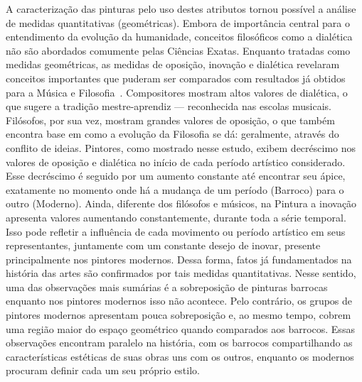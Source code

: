 A caracterização das pinturas pelo uso destes atributos tornou
possível a análise de medidas quantitativas (geométricas). Embora de
importância central para o entendimento da evolução da humanidade,
conceitos filosóficos como a dialética não são abordados comumente
pelas Ciências Exatas. Enquanto tratadas como medidas geométricas, as
medidas de oposição, inovação e dialética revelaram conceitos
importantes que puderam ser comparados com resultados já obtidos para
a Música e Filosofia~\cite{vieira}. Compositores mostram altos valores
de dialética, o que sugere a tradição mestre-aprendiz --- reconhecida
nas escolas musicais. Filósofos, por sua vez, mostram grandes valores
de oposição, o que também encontra base em como a evolução da
Filosofia se dá: geralmente, através do conflito de ideias. Pintores,
como mostrado nesse estudo, exibem decréscimo nos valores de oposição
e dialética no início de cada período artístico considerado. Esse
decréscimo é seguido por um aumento constante até encontrar seu ápice,
exatamente no momento onde há a mudança de um período (Barroco) para o
outro (Moderno). Ainda, diferente dos filósofos e músicos, na Pintura
a inovação apresenta valores aumentando constantemente, durante toda a
série temporal. Isso pode refletir a influência de cada movimento ou
período artístico em seus representantes, juntamente com um constante
desejo de inovar, presente principalmente nos pintores modernos. Dessa
forma, fatos já fundamentados na história das artes são confirmados
por tais medidas quantitativas. Nesse sentido, uma das observações
mais sumárias é a sobreposição de pinturas barrocas enquanto nos
pintores modernos isso não acontece. Pelo contrário, os grupos de
pintores modernos apresentam pouca sobreposição e, ao mesmo tempo,
cobrem uma região maior do espaço geométrico quando comparados aos
barrocos. Essas observações encontram paralelo na história, com os
barrocos compartilhando as características estéticas de suas obras uns
com os outros, enquanto os modernos procuram definir cada um seu
próprio estilo.

